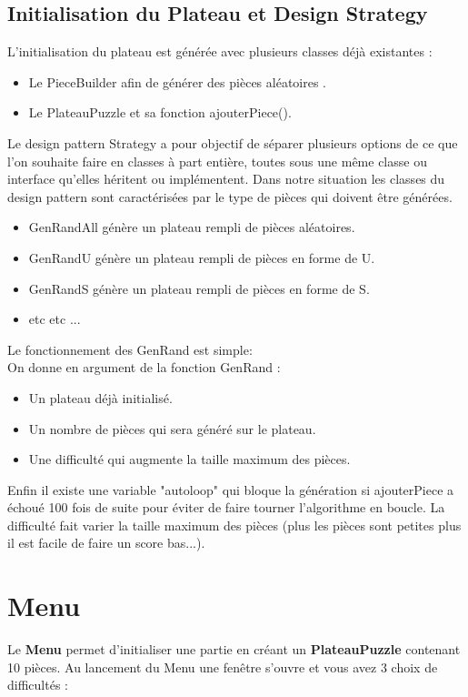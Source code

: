 \documentclass[a4paper,12pt]{article} %
\begin{document}
\subsection{Initialisation du Plateau et Design Strategy}
L'initialisation du plateau est générée avec plusieurs classes déjà existantes : 
\begin{itemize}
\item Le PieceBuilder afin de générer des pièces aléatoires .
\item Le PlateauPuzzle et sa fonction ajouterPiece().
\end{itemize}
Le design pattern Strategy a pour objectif de séparer plusieurs options de ce que l'on souhaite faire en classes à part entière, toutes sous une même classe ou interface qu'elles héritent ou implémentent.
Dans notre situation les classes du design pattern sont caractérisées par le type de pièces qui doivent être générées.
\begin{itemize}
\item GenRandAll génère un plateau rempli de pièces aléatoires.
\item GenRandU génère un plateau rempli de pièces en forme de U.
\item GenRandS génère un plateau rempli de pièces en forme de S.
\item etc etc ...
\end{itemize}
Le fonctionnement des GenRand est simple: \\
On donne en argument de la fonction GenRand :  
\begin{itemize}
\item Un plateau déjà initialisé.
\item Un nombre de pièces qui sera généré sur le plateau.
\item Une difficulté qui augmente la taille maximum des pièces.
\end{itemize}

Enfin il existe une variable "autoloop" qui bloque la génération si ajouterPiece a échoué 100 fois de suite pour éviter de  faire tourner l'algorithme  en boucle.
La difficulté fait varier la taille maximum des pièces (plus les pièces sont petites plus il est facile de faire un score bas...).

\section{Menu}
Le \textbf{Menu} permet d'initialiser une partie en créant un \textbf{PlateauPuzzle} contenant 10 pièces. Au lancement du Menu une fenêtre s'ouvre et vous avez 3 choix de difficultés :
\end{document}
